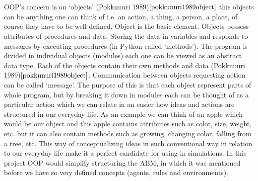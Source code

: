 \documentclass{article}
\begin{document}
\\\\OOP's concern is on `objects' (Pokkunuri 1989)$\cite{pokkunuri1989object}$ this objects can be anything one can think of i.e. an action, a thing, a person, a place, of course they have to be well defined. Object is the basic element. Objects possess attributes of procedures and data. Storing the data in variables and responds to messages by executing procedures (in Python called ‘methods’). The program is divided in individual objects (modules) each one can be viewed as an abstract data type. Each of the objects contain their own methods and data (Pokkunuri 1989)$\cite{pokkunuri1989object}$. Communication between objects requesting action can be called ‘message’. The purpose of this is that each object represent parts of whole program, but by breaking it down in modules each can be thought of as a particular action which we can relate in an easier how ideas and actions are structured in our everyday life. As an example we can think of an apple which would be our object and this apple contains attributes such as color, size, weight, etc. but it can also contain methods such as growing, changing color, falling from a tree, etc. This way of conceptualizing ideas in such conventional way in relation to our everyday life make it a perfect candidate for using in simulations. In this project OOP would simplify structuring the ABM, in which it was mentioned before we have so very defined concepts (agents, rules and environments). 
\end{document}

